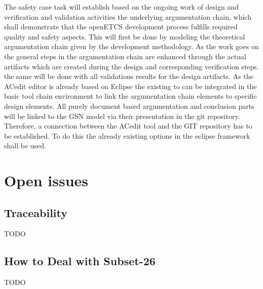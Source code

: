 The safety case task will establish based on the ongoing work of design and verification and validation activities the underlying argumentation chain, which shall demonstrate that the openETCS development process fulfills required quality and safety aspects. This will first be done by modeling the theoretical argumentation chain given by the development methodology. 
As the work goes on the general steps in the argumentation chain are enhanced through the actual artifacts which are created during the design and corresponding verification steps. the same will be done with all validations results for the design artifacts. 
As the ACedit editor is already based on Eclipse the existing to can be integrated in the basic tool chain environment to link the argumentation chain elements to specific design elements. All purely document based argumentation and conclusion parts will be linked to the GSN model via their presentation in the git repository. Therefore, a connection between the ACedit tool and the GIT repository has to be established. To do this the already existing options in the eclipse framework shall be used.

%

\section{Open issues}

\subsection{Traceability}

TODO

\subsection{How to Deal with Subset-26}

TODO

%
%

